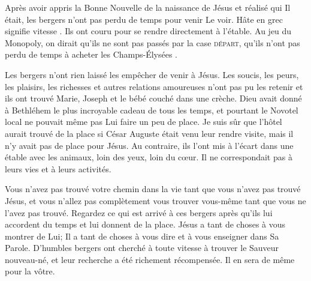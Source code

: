 

Après avoir appris la Bonne Nouvelle de la naissance de Jésus et réalisé qui Il était, les bergers n'ont pas perdu de temps pour venir Le voir. \Og Hâte \Fg{} en grec signifie \Og vitesse \Fg{}. Ils ont couru pour se rendre directement à l'étable. Au jeu du Monopoly, on dirait qu'ils ne sont pas passés par la case \textsc{départ}, qu'ils n'ont pas perdu de temps à acheter les \Og Champs-Élysées \Fg{}.

Les bergers n'ont rien laissé les empêcher de venir à Jésus. Les soucis, les peurs, les plaisirs, les richesses et autres relations amoureuses n'ont pas pu les retenir et ils ont trouvé Marie, Joseph et le bébé couché dans une crèche. Dieu avait donné à Bethléhem le plus incroyable cadeau de tous les temps, et pourtant le Novotel local ne pouvait même pas Lui faire un peu de place. Je suis sûr que l'hôtel aurait trouvé de la place si César Auguste était venu leur rendre visite, mais il n'y avait pas de place pour Jésus. Au contraire, ils l'ont mis à l'écart dans une étable avec les animaux, \Og loin des yeux, loin du cœur. \Fg{} Il ne correspondait pas à leurs vies et à leurs activités.

Vous n'avez pas trouvé votre chemin dans la vie tant que vous n'avez pas trouvé Jésus, et vous n'allez pas complètement \Og vous trouver vous-même \Fg{} tant que vous ne l'avez pas trouvé. Regardez ce qui est arrivé à ces bergers après qu'ils lui accordent du temps et lui donnent de la place. Jésus a tant de choses à vous montrer de Lui; Il a tant de choses à vous dire et à vous enseigner dans Sa Parole. D'humbles bergers ont cherché à toute vitesse à trouver le Sauveur nouveau-né, et leur recherche a été richement récompensée. Il en sera de même pour la vôtre.


\begin{dvquotes}

\end{dvquotes}
